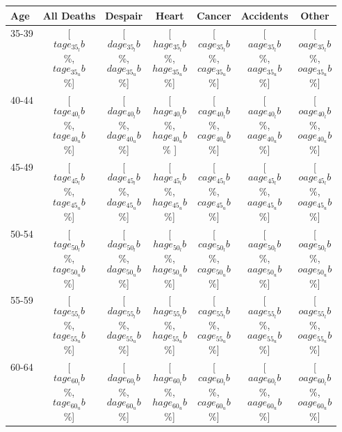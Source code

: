 \begin{tabular}{lcccccc}
\hline
\hline
\textbf{Age}& \textbf{All Deaths} & \textbf{Despair}
& \textbf{Heart} & \textbf{Cancer} &\textbf{Accidents} &
\textbf{Other} \\ 
\hline
35-39& [$$tage_35_lb$$\%,  $$tage_35_ub$$\%] &
[$$dage_35_lb$$\%,  $$dage_35_ub$$\%] & [$$hage_35_lb$$\%,  $$hage_35_ub$$\%] & [$$cage_35_lb$$\%,  $$cage_35_ub$$\%] &
[$$aage_35_lb$$\%,  $$aage_35_ub$$\%] & [$$oage_35_lb$$\%,  $$oage_35_ub$$\%] \\
40-44& [$$tage_40_lb$$\%,  $$tage_40_ub$$\%] &
[$$dage_40_lb$$\%,  $$dage_40_ub$$\%] & [$$hage_40_lb$$\%,  $$hage_40_ub$$\%
] & [$$cage_40_lb$$\%,  $$cage_40_ub$$\%] &
[$$aage_40_lb$$\%,  $$aage_40_ub$$\%] & [$$oage_40_lb$$\%,  $$oage_40_ub$$\%] \\
45-49& [$$tage_45_lb$$\%,  $$tage_45_ub$$\%] &
[$$dage_45_lb$$\%,  $$dage_45_ub$$\%] & [$$hage_45_lb$$\%,  $$hage_45_ub$$\%] & [$$cage_45_lb$$\%,  $$cage_45_ub$$\%] &
[$$aage_45_lb$$\%,  $$aage_45_ub$$\%] & [$$oage_45_lb$$\%,  $$oage_45_ub$$\%] \\
50-54& [$$tage_50_lb$$\%,  $$tage_50_ub$$\%] &
[$$dage_50_lb$$\%,  $$dage_50_ub$$\%] & [$$hage_50_lb$$\%,  $$hage_50_ub$$\%] & [$$cage_50_lb$$\%,  $$cage_50_ub$$\%] &
[$$aage_50_lb$$\%,  $$aage_50_ub$$\%] & [$$oage_50_lb$$\%,  $$oage_50_ub$$\%] \\
55-59& [$$tage_55_lb$$\%,  $$tage_55_ub$$\%] &
[$$dage_55_lb$$\%,  $$dage_55_ub$$\%] & [$$hage_55_lb$$\%,  $$hage_55_ub$$\%] & [$$cage_55_lb$$\%,  $$cage_55_ub$$\%] &
[$$aage_55_lb$$\%,  $$aage_55_ub$$\%] & [$$oage_55_lb$$\%,  $$oage_55_ub$$\%] \\
60-64& [$$tage_60_lb$$\%,  $$tage_60_ub$$\%] &
[$$dage_60_lb$$\%,  $$dage_60_ub$$\%] & [$$hage_60_lb$$\%,  $$hage_60_ub$$\%] & [$$cage_60_lb$$\%,  $$cage_60_ub$$\%] &
[$$aage_60_lb$$\%,  $$aage_60_ub$$\%] & [$$oage_60_lb$$\%,  $$oage_60_ub$$\%] \\
\hline
\end{tabular}

